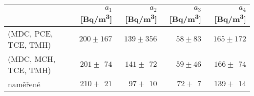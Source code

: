 \begin{tabular}{lrrrr}
\toprule
    & $a_1$ [\si{Bq/m^3}] &  $a_2$ [\si{Bq/m^3}]& $a_3$ [\si{Bq/m^3}]& $a_4$ [\si{Bq/m^3}]\\
\midrule
(MDC, PCE, TCE, TMH) &$200\pm167 $&$139\pm356 $&$58\pm83 $&$165\pm172 $\\
(MDC, MCH, TCE, TMH) &$ 201\pm\ \,74 $&$ 141\pm\ \,72 $&$59\pm46 $&$ 166\pm\ \,74 $\\
\midrule
   naměřené      & $210\pm\ \,21$       & $97\pm\ \,10$  &$72\pm\ \,7$ &$139\pm\ \,14$\\
\bottomrule
\end{tabular}
